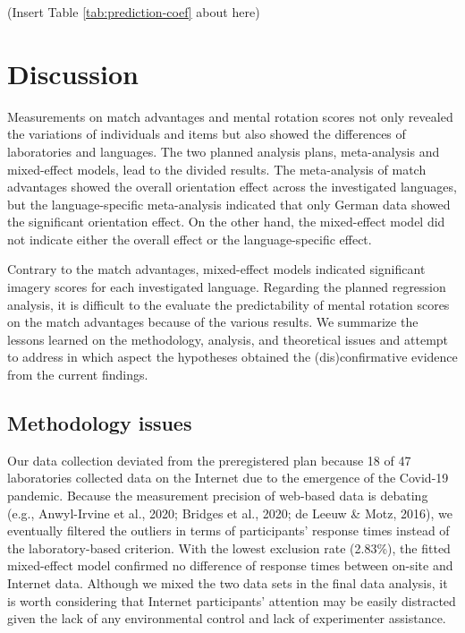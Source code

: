 \documentclass[
  man]{apa7}
\begin{document}
(Insert Table \ref{tab:prediction-coef} about here)

\hypertarget{discussion}{%
\section{Discussion}\label{discussion}}

Measurements on match advantages and mental rotation scores not only revealed the variations of individuals and items but also showed the differences of laboratories and languages. The two planned analysis plans, meta-analysis and mixed-effect models, lead to the divided results. The meta-analysis of match advantages showed the overall orientation effect across the investigated languages, but the language-specific meta-analysis indicated that only German data showed the significant orientation effect. On the other hand, the mixed-effect model did not indicate either the overall effect or the language-specific effect.

Contrary to the match advantages, mixed-effect models indicated significant imagery scores for each investigated language. Regarding the planned regression analysis, it is difficult to the evaluate the predictability of mental rotation scores on the match advantages because of the various results. We summarize the lessons learned on the methodology, analysis, and theoretical issues and attempt to address in which aspect the hypotheses obtained the (dis)confirmative evidence from the current findings.

\hypertarget{methodology-issues}{%
\subsection{Methodology issues}\label{methodology-issues}}

Our data collection deviated from the preregistered plan because 18 of 47 laboratories collected data on the Internet due to the emergence of the Covid-19 pandemic. Because the measurement precision of web-based data is debating (e.g., Anwyl-Irvine et al., 2020; Bridges et al., 2020; de Leeuw \& Motz, 2016), we eventually filtered the outliers in terms of participants' response times instead of the laboratory-based criterion. With the lowest exclusion rate (2.83\%), the fitted mixed-effect model confirmed no difference of response times between on-site and Internet data. Although we mixed the two data sets in the final data analysis, it is worth considering that Internet participants' attention may be easily distracted given the lack of any environmental control and lack of experimenter assistance.
\end{document}
